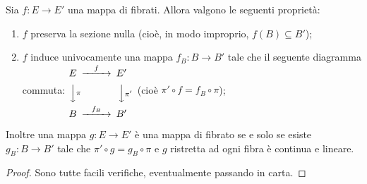 \begin{proposition} \label{prop:ProprietaMappeFibratiVettoriali}
	Sia $f:E \to E'$ una mappa di fibrati. Allora valgono le seguenti proprietà:
	\begin{enumerate}
	 \item $f$ preserva la sezione nulla (cioè, in modo improprio, $f(B)\subseteq B'$); \label{pmfv:SezioneNulla}
	 \item $f$ induce univocamente una mappa $f_B:B \to B'$ tale che il seguente diagramma commuta:  \label{pmfv:InduceMappaBasi}
	 $\begin{CD}
	 	E	@>f>>	E' \\
	 	@VV\pi V	@VV\pi' V \\
	 	B	@> f_B >> B'
	 \end{CD}\ \ $
	 (cioè $\pi'\circ f = f_B \circ \pi$);
	\end{enumerate}
	Inoltre una mappa $g: E \to E'$ è una mappa di fibrato se e solo se esiste $g_B:B \to B'$ tale che $\pi'\circ g = g_B\circ \pi$ e $g$ ristretta ad ogni fibra è continua e lineare.
\end{proposition}
\begin{proof}
	Sono tutte facili verifiche, eventualmente passando in carta.
\end{proof}




